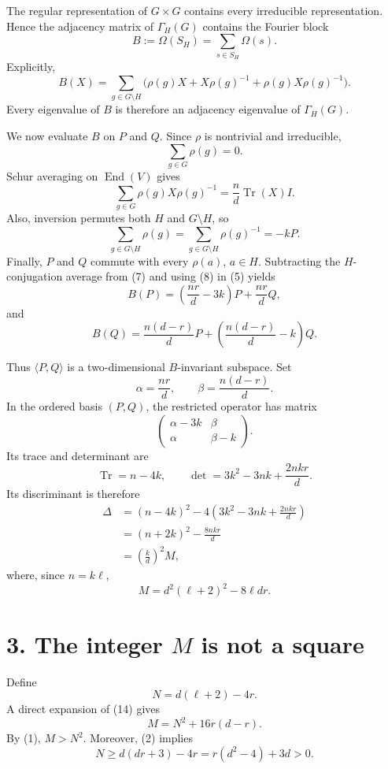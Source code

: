 \documentclass[11pt]{article}
\begin{document}
The regular representation of \(G\times G\) contains every irreducible
representation. Hence the adjacency matrix of \(\Gamma_H(G)\) contains the
Fourier block
\[
 B:=\Omega(S_H)=\sum_{s\in S_H}\Omega(s).
\]
Explicitly,
\[
 B(X)=\sum_{g\in G\setminus H}
 \bigl(\rho(g)X+X\rho(g)^{-1}+\rho(g)X\rho(g)^{-1}\bigr). \tag{5}
\]
Every eigenvalue of \(B\) is therefore an adjacency eigenvalue of
\(\Gamma_H(G)\).

We now evaluate \(B\) on \(P\) and \(Q\). Since \(\rho\) is nontrivial and
irreducible,
\[
 \sum_{g\in G}\rho(g)=0. \tag{6}
\]
Schur averaging on \(\operatorname{End}(V)\) gives
\[
 \sum_{g\in G}\rho(g)X\rho(g)^{-1}
   =\frac{n}{d}\operatorname{Tr}(X)I. \tag{7}
\]
Also, inversion permutes both \(H\) and \(G\setminus H\), so
\[
 \sum_{g\in G\setminus H}\rho(g)
 =\sum_{g\in G\setminus H}\rho(g)^{-1}
 =-kP. \tag{8}
\]
Finally, \(P\) and \(Q\) commute with every \(\rho(a)\), \(a\in H\).
Subtracting the \(H\)-conjugation average from (7) and using (8) in (5)
yields
\[
 B(P)=\left(\frac{nr}{d}-3k\right)P+\frac{nr}{d}Q, \tag{9}
\]
and
\[
 B(Q)=\frac{n(d-r)}{d}P+
       \left(\frac{n(d-r)}{d}-k\right)Q. \tag{10}
\]

Thus \(\langle P,Q\rangle\) is a two-dimensional \(B\)-invariant subspace.
Set
\[
 \alpha=\frac{nr}{d},\qquad
 \beta=\frac{n(d-r)}{d}.
\]
In the ordered basis \((P,Q)\), the restricted operator has matrix
\[
 \begin{pmatrix}
   \alpha-3k & \beta\\
   \alpha    & \beta-k
 \end{pmatrix}. \tag{11}
\]
Its trace and determinant are
\[
 \operatorname{Tr}=n-4k,\qquad
 \det=3k^2-3nk+\frac{2nkr}{d}. \tag{12}
\]
Its discriminant is therefore
\[
 \begin{aligned}
 \Delta
   &=(n-4k)^2
     -4\left(3k^2-3nk+\frac{2nkr}{d}\right)\\
   &=(n+2k)^2-\frac{8nkr}{d}\\
   &=\left(\frac{k}{d}\right)^2 M,
 \end{aligned} \tag{13}
\]
where, since \(n=k\ell\),
\[
 M=d^2(\ell+2)^2-8\ell dr. \tag{14}
\]

\section*{3. The integer \(M\) is not a square}

Define
\[
 N=d(\ell+2)-4r.
\]
A direct expansion of (14) gives
\[
 M=N^2+16r(d-r). \tag{15}
\]
By (1), \(M>N^2\). Moreover, (2) implies
\[
 N\geq d(dr+3)-4r
   =r(d^2-4)+3d>0. \tag{16}
\]
\end{document}
